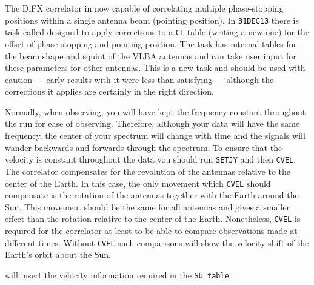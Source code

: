 The DiFX correlator in now capable of correlating multiple
phase-stopping positions within a single antenna beam (pointing
position).  In {\tt 31DEC13} there is task called {\tt {}}
designed to apply corrections to a {\tt CL} table (writing a new one)
for the offset of phase-stopping and pointing position.  The task has
internal tables for the beam shape and squint of the VLBA antennas and
can take user input for these parameters for other antennas.  This is
a new task and should be used with caution --- early results with it
were less than satisfying --- although the corrections it applies are
certainly in the right direction.


Normally, when observing, you will have kept the frequency constant
throughout the run for ease of observing.
Therefore, although your data will have the same frequency, the center
 of your spectrum will change with time and the
 signals will wander backwards and forwards
through the spectrum.  To ensure that the velocity is constant
throughout the data you should run {\tt SETJY} and then {\tt CVEL}\@.
The  correlator compensates for the revolution of the
antennas relative to the center of the Earth. In this case, the only
movement which {\tt CVEL} should compensate is the rotation of the
antennas together with the Earth around the Sun.  This movement should
be the same for all antennas and gives a smaller effect than the
rotation relative to the center of the Earth.  Nonetheless, {\tt CVEL}
is required for the  correlator at least to be able to
compare observations made at different times.  Without {\tt CVEL} such
comparisons will show the velocity shift of the Earth's orbit about
the Sun.

     {\tt {}} will insert the velocity information required
in the {\tt SU table}:
\pd

